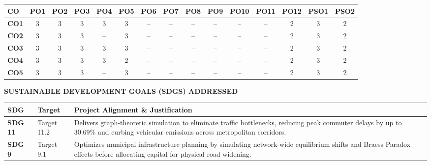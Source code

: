 \documentclass[12pt,a4paper]{report}
\begin{document}
\vspace{0.35cm}
\noindent
\begin{center}
\small
\setlength{\tabcolsep}{3.5pt}
\begin{tabular}{|l|c|c|c|c|c|c|c|c|c|c|c|c|c|c|}
\hline
\textbf{CO} & \textbf{PO1} & \textbf{PO2} & \textbf{PO3} & \textbf{PO4} & \textbf{PO5} & \textbf{PO6} & \textbf{PO7} & \textbf{PO8} & \textbf{PO9} & \textbf{PO10} & \textbf{PO11} & \textbf{PO12} & \textbf{PSO1} & \textbf{PSO2} \\ \hline
\textbf{CO1} & 3 & 3 & 3 & 3 & 3 & -- & -- & -- & -- & -- & -- & 2 & 3 & 2 \\ \hline
\textbf{CO2} & 3 & 3 & 3 & -- & 3 & -- & -- & -- & -- & -- & -- & 2 & 3 & 2 \\ \hline
\textbf{CO3} & 3 & 3 & 3 & 3 & 3 & -- & -- & -- & -- & -- & -- & 2 & 3 & 2 \\ \hline
\textbf{CO4} & 3 & 3 & 3 & 3 & 2 & -- & -- & -- & -- & -- & -- & 2 & 3 & 2 \\ \hline
\textbf{CO5} & 3 & 3 & 3 & -- & 3 & -- & -- & -- & -- & -- & -- & 2 & 3 & 2 \\ \hline
\end{tabular}
\end{center}

\vspace{0.6cm}
\begin{center}
    {\large\bfseries SUSTAINABLE DEVELOPMENT GOALS (SDGS) ADDRESSED\par}
\end{center}
\vspace{0.2cm}
\noindent
\begin{center}
\small
\begin{tabularx}{\textwidth}{|l|l|X|}
\hline
\textbf{SDG} & \textbf{Target} & \textbf{Project Alignment \& Justification} \\ \hline
\textbf{SDG 11} & Target 11.2 & Delivers graph-theoretic simulation to eliminate traffic bottlenecks, reducing peak commuter delays by up to 30.69\% and curbing vehicular emissions across metropolitan corridors. \\ \hline
\textbf{SDG 9} & Target 9.1 & Optimizes municipal infrastructure planning by simulating network-wide equilibrium shifts and Braess Paradox effects before allocating capital for physical road widening. \\ \hline
\end{tabularx}
\end{center}

\newpage
{}
\tableofcontents
\end{document}
